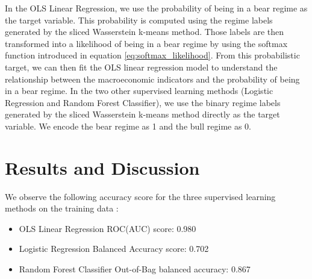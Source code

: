 \documentclass[12pt,a4paper]{report}
\begin{document}
In the OLS Linear Regression, we use the probability of being in a bear regime as the target variable. This probability is computed using 
the regime labels generated by the sliced Wasserstein k-means method. Those labels are then transformed into a likelihood of being in a bear regime by using the softmax function introduced in equation \ref{eq:softmax_likelihood}.
From this probabilistic target, we can then fit the OLS linear regression model to understand the relationship between the macroeconomic indicators and the probability of being in a bear regime.
In the two other supervised learning methods (Logistic Regression and Random Forest Classifier), we use the binary regime labels generated by the sliced Wasserstein k-means method directly as the target variable.
We encode the bear regime as 1 and the bull regime as 0. 

\section{Results and Discussion}
We observe the following accuracy score for the three supervised learning methods on the training data :
\begin{itemize}
  \item OLS Linear Regression ROC(AUC) score: 0.980
  \item Logistic Regression Balanced Accuracy score: 0.702
  \item Random Forest Classifier Out-of-Bag balanced accuracy: 0.867
\end{itemize}
\end{document}
